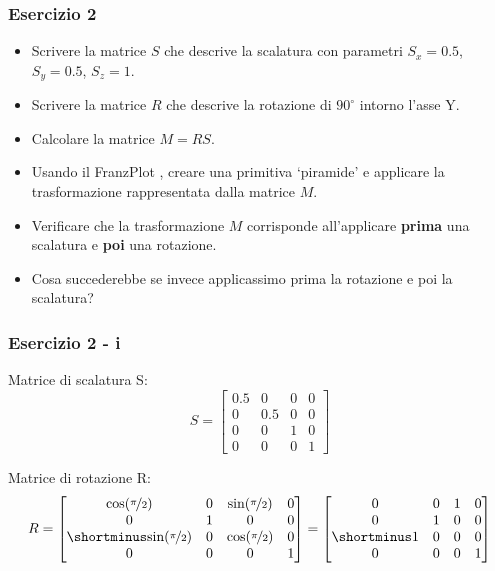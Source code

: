 \documentclass{beamer}
\newcommand{\frnzplt}{FranzPlot }
\begin{document}
\begin{frame}
\frametitle{Esercizio 2}
\begin{itemize}
    \item Scrivere la matrice $S$ che descrive la scalatura con parametri $S_x = 0.5$, $S_y = 0.5$, $S_z = 1$.
    \item Scrivere la matrice $R$ che descrive la rotazione di $90^\circ$ intorno l'asse Y.
    \item Calcolare la matrice $M = R S$.
    \item Usando il \frnzplt, creare una primitiva `piramide' e applicare la trasformazione rappresentata dalla matrice $M$.
    \item Verificare che la trasformazione $M$ corrisponde all'applicare \textbf{prima} una scalatura e \textbf{poi} una rotazione.
    \item Cosa succederebbe se invece applicassimo prima la rotazione e poi la scalatura? 
\end{itemize}
\end{frame}

\begin{frame}
\frametitle{Esercizio 2 - i}
Matrice di scalatura S:
\begin{displaymath}
S = 
\begin{bmatrix}
    0.5 & 0   & 0   & 0 \\
      0 & 0.5 & 0   & 0 \\
      0 & 0   & 1   & 0 \\
      0 & 0   & 0   & 1 
\end{bmatrix}
\end{displaymath}

Matrice di rotazione R:
\begin{displaymath}
R = 
\begin{bmatrix}
    \mbox{cos}(\nicefrac{\pi}{2}) & 0 & \mbox{sin}(\nicefrac{\pi}{2}) & 0\\
        0 & 1 & 0 & 0 \\
        \shortminus \mbox{sin}(\nicefrac{\pi}{2}) & 0 & \mbox{cos}(\nicefrac{\pi}{2}) & 0 \\
    0 & 0 & 0 & 1 
\end{bmatrix}
=
\begin{bmatrix}
        0 & 0 & 1 & 0\\
        0 & 1 & 0 & 0 \\
        \shortminus 1 & 0 & 0 & 0 \\
    0 & 0 & 0 & 1 
\end{bmatrix}
\end{displaymath}
\end{frame}
\end{document}
